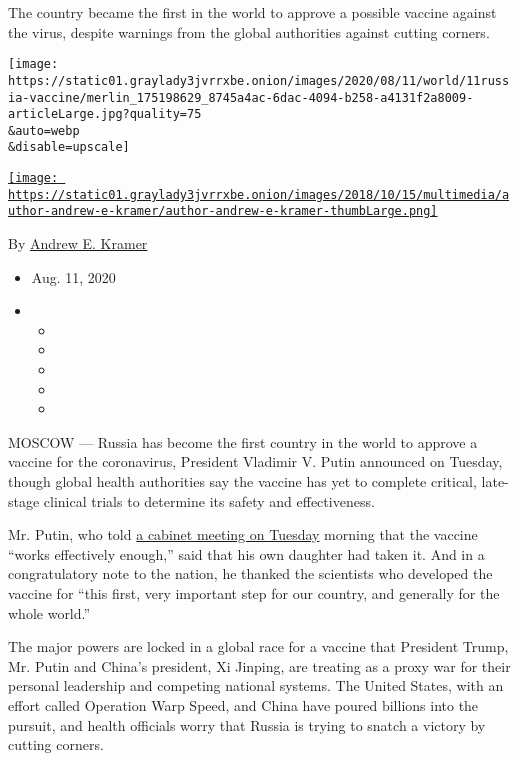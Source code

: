 The country became the first in the world to approve a possible vaccine
against the virus, despite warnings from the global authorities against
cutting corners.

\texttt{[image: https://static01.graylady3jvrrxbe.onion/images/2020/08/11/world/11russia-vaccine/merlin\_175198629\_8745a4ac-6dac-4094-b258-a4131f2a8009-articleLarge.jpg?quality=75\\\&auto=webp\\\&disable=upscale]}

\href{https://www.nytimes3xbfgragh.onion/by/andrew-e-kramer}{\texttt{[image: https://static01.graylady3jvrrxbe.onion/images/2018/10/15/multimedia/author-andrew-e-kramer/author-andrew-e-kramer-thumbLarge.png]}}

By \href{https://www.nytimes3xbfgragh.onion/by/andrew-e-kramer}{Andrew
E. Kramer}

\begin{itemize}
\item
  Aug. 11, 2020
\item
  \begin{itemize}
  \item
  \item
  \item
  \item
  \item
  \end{itemize}
\end{itemize}

MOSCOW --- Russia has become the first country in the world to approve a
vaccine for the coronavirus, President Vladimir V. Putin announced on
Tuesday, though global health authorities say the vaccine has yet to
complete critical, late-stage clinical trials to determine its safety
and effectiveness.

Mr. Putin, who told \href{https://www.interfax.ru/russia/721241}{a
cabinet meeting on Tuesday} morning that the vaccine ``works effectively
enough,'' said that his own daughter had taken it. And in a
congratulatory note to the nation, he thanked the scientists who
developed the vaccine for ``this first, very important step for our
country, and generally for the whole world.''

The major powers are locked in a global race for a vaccine that
President Trump, Mr. Putin and China's president, Xi Jinping, are
treating as a proxy war for their personal leadership and competing
national systems. The United States, with an effort called Operation
Warp Speed, and China have poured billions into the pursuit, and health
officials worry that Russia is trying to snatch a victory by cutting
corners.


